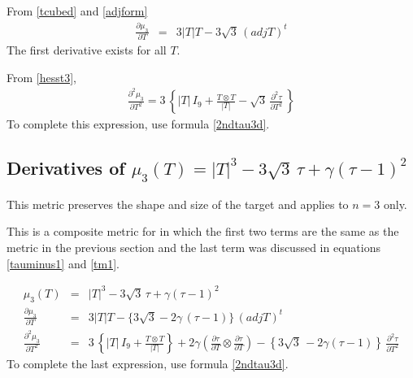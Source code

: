 \documentclass{report}
\begin{document}
\noindent From \ref{tcubed} and \ref{adjform}
\begin{eqnarray}
\frac{\partial \mu_3}{\partial T} & = & 3 |T| T - 3 \sqrt{3} \, (adj T)^t
\end{eqnarray}
The first derivative exists for all $T$. \newline

\noindent From \ref{hesst3},
\begin{eqnarray}
\frac{\partial^2 \mu_3}{\partial T^2} = 3 \, \left\{ |T| \, I_9 + \frac{T \otimes T}{|T|} - \sqrt{3} \, \frac{\partial^2 \tau}{\partial T^2} \, \right\}
\end{eqnarray}
To complete this expression, use formula \ref{2ndtau3d}. \newline

\subsection{Derivatives of $\mu_3(T) = |T|^3 - 3 \sqrt{3} \, \tau + \gamma (\tau-1)^2$ \label{ss3d}}

\noindent This metric preserves the shape and size of the target and applies
to $n=3$ only. \newline

\noindent This is a composite metric for in which the first two terms are the 
same as the metric in the previous section and the last term was discussed
in equations \ref{tauminus1} and \ref{tm1}. \newline 

\begin{eqnarray}
\mu_3 (T) & = & |T|^3 - 3 \sqrt{3} \, \tau + \gamma (\tau-1)^2 \\
\frac{\partial \mu_3}{\partial T} & = & 3 |T| T - \{ 3 \sqrt{3} - 2 \gamma \, (\tau-1) \}  \, (adj T)^t \\ \nonumber
\frac{\partial^2 \mu_3}{\partial T^2} & = & 3 \, \left\{ |T| \, I_9 + \frac{T \otimes T}{|T|} \right\} + 2 \gamma \left( \frac{\partial \tau}{\partial T} \otimes \frac{\partial \tau}{\partial T} \right)- \left\{ 3 \sqrt{3} \, - 2 \gamma (\tau-1) \right\} \, \frac{\partial^2 \tau}{\partial T^2}
\end{eqnarray}
To complete the last expression, use formula \ref{2ndtau3d}. \newline
\end{document}
